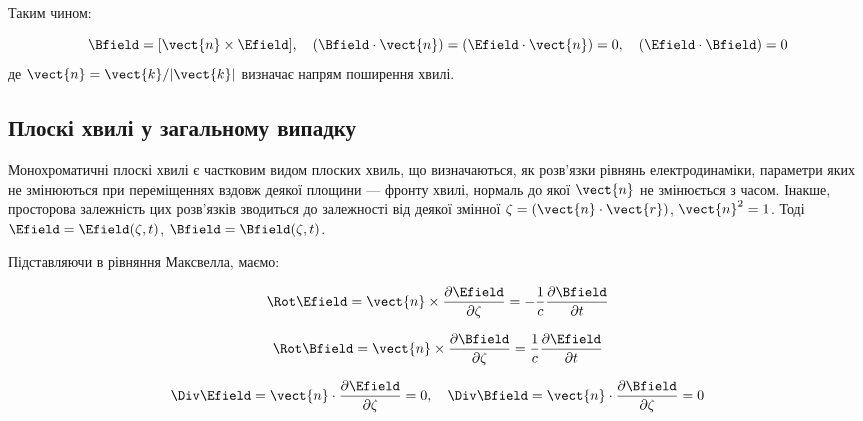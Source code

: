 Таким чином:

\begin{equation*}
	\Bfield = [\vect{n} \times \Efield], \quad (\Bfield \cdot \vect{n}) = (\Efield \cdot \vect{n}) = 0, \quad (\Efield \cdot \Bfield) = 0
	\label{eq:wave_properties}
\end{equation*}
де \(\vect{n} = \vect{k} / |\vect{k}|\) визначає напрям поширення хвилі.

\subsection*{Плоскі хвилі у загальному випадку}

Монохроматичні плоскі хвилі є частковим видом плоских хвиль, що визначаються, як розв'язки рівнянь електродинаміки,
параметри яких не змінюються при переміщеннях вздовж деякої площини --- фронту хвилі, нормаль до якої \(\vect{n}\) не
змінюється з часом. Інакше, просторова залежність цих розв'язків зводиться до залежності від деякої змінної \(\zeta =
(\vect{n} \cdot \vect{r})\), \(\vect{n}^2 = 1\). Тоді $\Efield = \Efield(\zeta, t)$, $\Bfield = \Bfield(\zeta, t)$.

Підставляючи в рівняння Максвелла, маємо:

\begin{equation}
	\Rot\Efield = \vect{n} \times \frac{\partial \Efield}{\partial \zeta } = -\frac{1}{c} \frac{\partial \Bfield}{\partial t}
	\label{eq:maxwell_rotE}
\end{equation}

\begin{equation}
	\Rot\Bfield = \vect{n} \times \frac{\partial \Bfield}{\partial\zeta} = \frac{1}{c} \frac{\partial \Efield}{\partial t}
	\label{eq:maxwell_rotB}
\end{equation}

\begin{equation}
	\Div\Efield = \vect{n} \cdot \frac{\partial \Efield}{\partial\zeta} = 0, \quad \Div\Bfield = \vect{n} \cdot
	\frac{\partial \Bfield}{\partial \zeta} = 0
	\label{eq:maxwell_div}
\end{equation}

